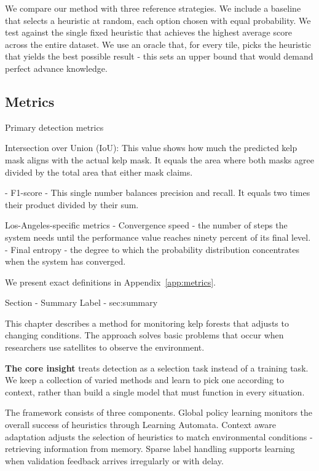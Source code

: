 \documentclass[11pt,a4paper]{article}
\begin{document}
\begin{itemize}
We compare our method with three reference strategies. 
We include a baseline that selects a heuristic at random, each option chosen with equal probability. 
We test against the single fixed heuristic that achieves the highest average score across the entire dataset. 
We use an oracle that, for every tile, picks the heuristic that yields the best possible result - this sets an upper bound that would demand perfect advance knowledge.

\subsection{Metrics}

Primary detection metrics

Intersection over Union (IoU): This value shows how much the predicted kelp mask aligns with the actual kelp mask. It equals the area where both masks agree divided by the total area that either mask claims.

- F1-score - This single number balances precision and recall. It equals two times their product divided by their sum.

Los-Angeles-specific metrics
- Convergence speed - the number of steps the system needs until the performance value reaches ninety percent of its final level.
- Final entropy - the degree to which the probability distribution concentrates when the system has converged.

We present exact definitions in Appendix~\ref{app:metrics}.


Section - Summary 
Label - sec:summary

This chapter describes a method for monitoring kelp forests that adjusts to changing conditions. The approach solves basic problems that occur when researchers use satellites to observe the environment.

\textbf{The core insight} treats detection as a selection task instead of a training task. We keep a collection of varied methods and learn to pick one according to context, rather than build a single model that must function in every situation.

The framework consists of three components. 
Global policy learning monitors the overall success of heuristics through Learning Automata. 
Context aware adaptation adjusts the selection of heuristics to match environmental conditions - retrieving information from memory. 
Sparse label handling supports learning when validation feedback arrives irregularly or with delay.


\end{itemize}
\end{document}
